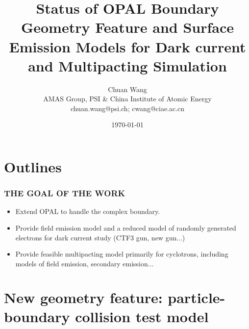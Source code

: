 \documentclass{beamer}
\title[Efforts on OPAL towards Dark current \& Multipacting Simulation]{Status of OPAL Boundary Geometry Feature and Surface Emission Models for Dark current and Multipacting Simulation
 }
\author[Chuan Wang]{Chuan Wang \\
AMAS Group, PSI \& China Institute of Atomic Energy \\
chuan.wang@psi.ch; cwang@ciae.ac.cn}
\date{\today}
\begin{document}
\begin{frame}
\titlepage
\end{frame}
\section*{Outlines}
\begin{frame}
\tableofcontents
\end{frame}
\begin{frame}
\frametitle{THE GOAL OF THE WORK}
\begin{itemize}
\item Extend OPAL to handle the complex boundary.

\item Provide field emission model and a reduced model of randomly generated electrons for dark current study (CTF3 gun, new gun...)

\item Provide feasible multipacting model primarily for cyclotrons, including models of field emission, secondary emission...
\end{itemize}
\end{frame}
\section{New geometry feature: particle-boundary collision test model}
\end{document}
